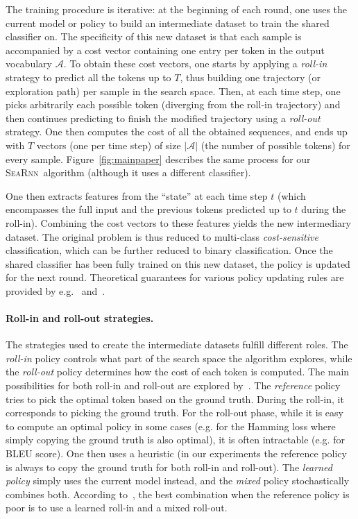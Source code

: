\documentclass{article}
\newcommand{\SEARNN}{\textsc{SeaRnn}}
\begin{document}
	The training procedure is iterative: at the beginning of each round, one uses the current model or policy to build an intermediate dataset to train the shared classifier on.
	The specificity of this new dataset is that each sample is accompanied by a cost vector containing one entry per token in the output vocabulary $\mathcal{A}$.
	To obtain these cost vectors, one starts by applying a \textit{roll-in} strategy to predict all the tokens up to $T$, thus building one trajectory (or exploration path) per sample in the search space.
	Then, at each time step, one picks arbitrarily each possible token (diverging from the roll-in trajectory) and then continues predicting to finish the modified trajectory using a \textit{roll-out} strategy.
	One then computes the cost of all the obtained sequences, and ends up with $T$ vectors (one per time step) of size $|\mathcal{A}|$ (the number of possible tokens) for every sample.
	Figure~\ref{fig:mainpaper} describes the same process for our \SEARNN\ algorithm (although it uses a different classifier).	

	One then extracts features from the ``state'' at each time step $t$ (which encompasses the full input and the previous tokens predicted up to $t$ during the roll-in).
	Combining the cost vectors to these features yields the new intermediary dataset.
	The original problem is thus reduced to multi-class \emph{cost-sensitive} classification, which can be further reduced to binary classification.
	Once the shared classifier has been fully trained on this new dataset, the policy is updated for the next round.
	Theoretical guarantees for various policy updating rules are provided by e.g.~\citet{Daume2009b} and~\citet{Chang2015}. 
	

	\vspace{-1mm}
	\paragraph{Roll-in and roll-out strategies.}
	The strategies used to create the intermediate datasets fulfill different roles.
	The \textit{roll-in} policy controls what part of the search space the algorithm explores, while the \textit{roll-out} policy determines how the cost of each token is computed.
	The main possibilities for both roll-in and roll-out are explored by~\citet{Chang2015}.
	The \textit{reference} policy tries to pick the optimal token based on the ground truth.
	During the roll-in, it corresponds to picking the ground truth.
	For the roll-out phase, while it is easy to compute an optimal policy in some cases (e.g. for the Hamming loss where simply copying the ground truth is also optimal), it is often intractable (e.g. for BLEU score).
	One then uses a heuristic (in our experiments the reference policy is always to copy the ground truth for both roll-in and roll-out).
	The \emph{learned policy} simply uses the current model instead, and the \textit{mixed} policy stochastically combines both.
	According to~\citet{Chang2015}, the best combination when the reference policy is poor is to use a learned roll-in and a mixed roll-out.
\end{document}
